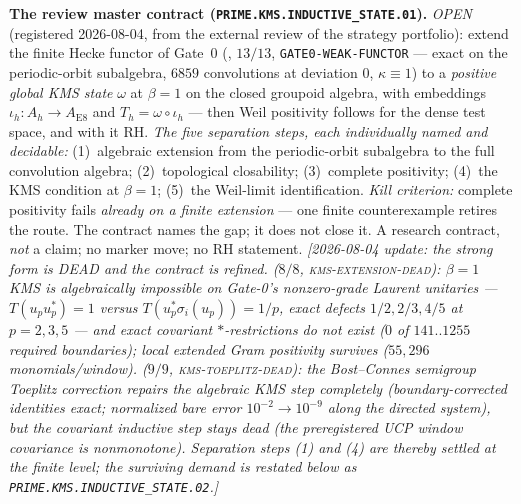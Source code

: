\par\smallskip\noindent\textbf{The review master contract
(\texttt{PRIME.KMS.INDUCTIVE\_STATE.01}).}
\emph{OPEN} (registered 2026-08-04, from the external review of the
strategy portfolio): extend the finite Hecke functor of Gate~0
(, $13/13$,
\texttt{GATE0-WEAK-FUNCTOR} --- exact on the periodic-orbit
subalgebra, $6859$ convolutions at deviation $0$, $\kappa\equiv1$) to
a \emph{positive global KMS state} $\omega$ at $\beta=1$ on the
closed groupoid algebra, with embeddings
$\iota_h\colon A_h\to A_{\mathrm{E8}}$ and
$T_h=\omega\circ\iota_h$ --- then Weil positivity follows for the
dense test space, and with it RH.  \emph{The five separation steps,
each individually named and decidable:} (1)~algebraic extension from
the periodic-orbit subalgebra to the full convolution algebra;
(2)~topological closability; (3)~complete positivity; (4)~the KMS
condition at $\beta=1$; (5)~the Weil-limit identification.
\emph{Kill criterion:} complete positivity fails \emph{already on a
finite extension} --- one finite counterexample retires the route.
The contract names the gap; it does not close it.  A research
contract, \emph{not} a claim; no marker move; no RH statement.
\emph{[2026-08-04 update: the strong form is DEAD and the contract is
refined.   ($8/8$,
\textsc{kms-extension-dead}): $\beta=1$ KMS is algebraically
impossible on Gate-0's nonzero-grade Laurent unitaries ---
$T(u_pu_p^*)=1$ versus $T(u_p^*\sigma_i(u_p))=1/p$, exact defects
$1/2,2/3,4/5$ at $p=2,3,5$ --- and exact covariant
$*$-restrictions do not exist ($0$ of $141..1255$ required
boundaries); local extended Gram positivity survives
($55{,}296$ monomials/window).
 ($9/9$,
\textsc{kms-toeplitz-dead}): the Bost--Connes semigroup Toeplitz
correction repairs the algebraic KMS step \emph{completely}
(boundary-corrected identities exact; normalized bare error
$10^{-2}\to10^{-9}$ along the directed system), but the covariant
inductive step stays dead (the preregistered UCP window covariance
is nonmonotone).  Separation steps (1) and (4) are thereby settled
at the finite level; the surviving demand is restated below as
\texttt{PRIME.KMS.INDUCTIVE\_STATE.02}.]}


